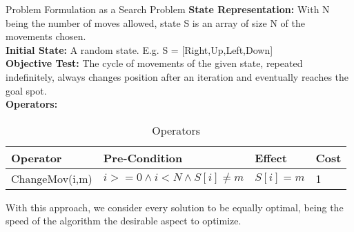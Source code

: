 

\begin{frame}{Problem Formulation as a Search Problem}
    \textbf{State Representation:} With N being the number of moves allowed, state S is an array of size N of the movements chosen. \\
    \textbf{Initial State:} A random state. E.g. S = [Right,Up,Left,Down] \\
    \textbf{Objective Test:} The cycle of movements of the given state, repeated indefinitely, always changes position after an iteration and eventually reaches the goal spot. \\
    \textbf{Operators:}
    \begin{table}
        \begin{tabular}{l l l l}
            \toprule
            \textbf{Operator} & \textbf{Pre-Condition} & \textbf{Effect} & \textbf{Cost} \\
            \midrule
            ChangeMov(i,m)  & $ i >= 0 \land i < N \land S[i] \neq m $ & $S[i] = m $  & 1 \\
            \bottomrule
        \end{tabular}
        \caption{Operators}
    \end{table}
    
    With this approach, we consider every solution to be equally optimal, being the speed of the algorithm the desirable aspect to optimize.
\end{frame}
